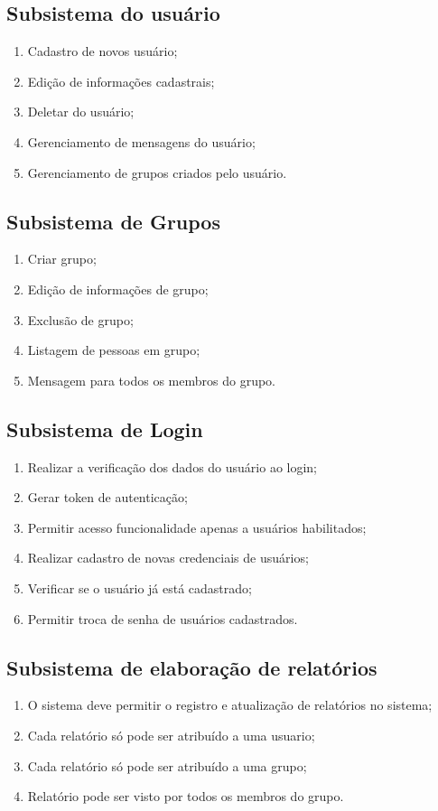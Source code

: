 \subsection{Subsistema do usuário}
\begin{enumerate}
  \item Cadastro de novos usuário;
  \item Edição de informações cadastrais;
  \item Deletar do usuário;
  \item Gerenciamento de mensagens do usuário;
  \item Gerenciamento de grupos criados pelo usuário.
\end{enumerate}
\subsection{Subsistema de Grupos}
\begin{enumerate}
  \item Criar grupo;
  \item Edição de informações de grupo;
  \item Exclusão de grupo;
  \item Listagem de pessoas em grupo;
  \item Mensagem para todos os membros do grupo.
\end{enumerate}

\subsection{Subsistema de Login}
\begin{enumerate}
  \item Realizar a verificação dos dados do usuário ao login;
  \item Gerar token de autenticação;
  \item Permitir acesso funcionalidade apenas a usuários habilitados;
  \item Realizar cadastro de novas credenciais de usuários;
  \item Verificar se o usuário já está cadastrado;
  \item Permitir troca de senha de usuários cadastrados.

\end{enumerate}

\subsection{Subsistema de elaboração de relatórios}
\begin{enumerate}
  \item O sistema deve permitir o registro e atualização de relatórios no sistema;
  \item Cada relatório só pode ser atribuído a uma usuario;
  \item Cada relatório só pode ser atribuído a uma grupo;
  \item Relatório pode ser visto por todos os membros do grupo.

\end{enumerate}

